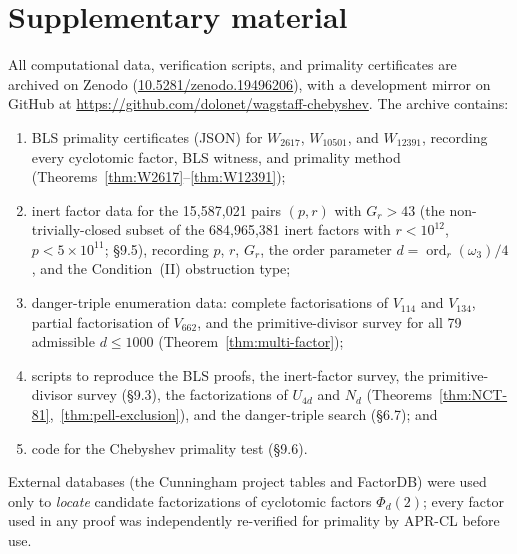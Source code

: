\documentclass[12pt]{article}
\theoremstyle{plain}
\theoremstyle{definition}
\theoremstyle{remark}
\begin{document}
\section*{Supplementary material}

All computational data, verification scripts, and primality
certificates are archived on Zenodo
(\href{https://doi.org/10.5281/zenodo.19496206}{10.5281/zenodo.19496206}),
with a development mirror on GitHub at
\url{https://github.com/dolonet/wagstaff-chebyshev}.
The archive contains:
\begin{enumerate}
\item BLS primality certificates (JSON) for \(W_{2617}\),
\(W_{10501}\), and \(W_{12391}\), recording every cyclotomic
factor, BLS witness, and primality method
(Theorems~\ref{thm:W2617}--\ref{thm:W12391});
\item inert factor data for the 15{,}587{,}021 pairs \((p, r)\) with
\(G_r > 43\) (the non-trivially-closed subset of the 684{,}965{,}381
inert factors with \(r < 10^{12}\), \(p < 5 \times 10^{11}\);
\S9.5), recording \(p\), \(r\), \(G_r\),
the order parameter \(d = \operatorname{ord}_r(\omega_3)/4\),
and the Condition~(II) obstruction type;
\item danger-triple enumeration data: complete factorisations of
\(V_{114}\) and \(V_{134}\), partial factorisation of \(V_{662}\),
and the primitive-divisor survey for all 79 admissible
\(d \leq 1000\) (Theorem~\ref{thm:multi-factor});
\item scripts to reproduce the BLS proofs, the inert-factor
survey, the primitive-divisor survey (\S9.3), the
factorizations of \(U_{4d}\) and \(N_d\)
(Theorems~\ref{thm:NCT-81},~\ref{thm:pell-exclusion}), and the
danger-triple search (\S6.7); and
\item code for the Chebyshev primality test (\S9.6).
\end{enumerate}

External databases (the Cunningham project tables \cite{ref4} and
FactorDB) were used only to \emph{locate} candidate factorizations of
cyclotomic factors \(\Phi_d(2)\); every factor used in any proof was
independently re-verified for primality by APR-CL before use.
\end{document}

